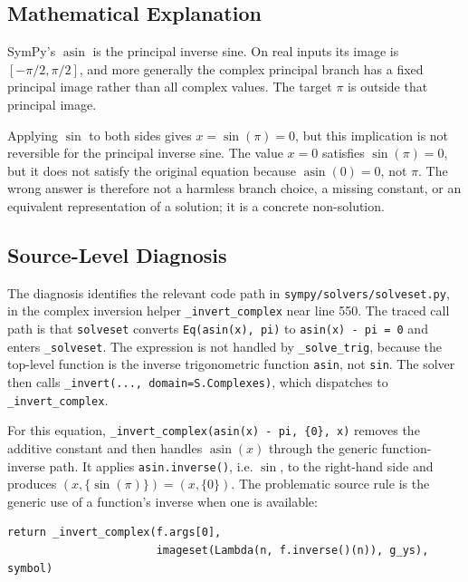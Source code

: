 \documentclass[11pt]{article}
\begin{document}
\subsection{Mathematical Explanation}

SymPy's \(\operatorname{asin}\) is the principal inverse sine.  On real inputs its image is
\([-\pi/2,\pi/2]\), and more generally the complex principal branch has a fixed
principal image rather than all complex values.  The target \(\pi\) is outside
that principal image.

Applying \(\sin\) to both sides gives \(x=\sin(\pi)=0\), but this implication
is not reversible for the principal inverse sine.  The value \(x=0\) satisfies
\(\sin(\pi)=0\), but it does not satisfy the original equation because
\(\operatorname{asin}(0)=0\), not \(\pi\).  The wrong answer is therefore not a harmless
branch choice, a missing constant, or an equivalent representation of a
solution; it is a concrete non-solution.

\subsection{Source-Level Diagnosis}

The diagnosis identifies the relevant code path in
\nolinkurl{sympy/solvers/solveset.py}, in the complex inversion helper
\texttt{\_invert\_complex} near line 550.  The traced call path is that
\texttt{solveset} converts \texttt{Eq(asin(x), pi)} to
\texttt{asin(x) - pi = 0} and enters \texttt{\_solveset}.  The expression is
not handled by \texttt{\_solve\_trig}, because the top-level function is the
inverse trigonometric function \texttt{asin}, not \texttt{sin}.  The solver then
calls \texttt{\_invert(..., domain=S.Complexes)}, which dispatches to
\texttt{\_invert\_complex}.

For this equation, \texttt{\_invert\_complex(asin(x) - pi, \{0\}, x)} removes
the additive constant and then handles \(\operatorname{asin}(x)\) through the generic
function-inverse path.  It applies \texttt{asin.inverse()}, i.e. \(\sin\), to
the right-hand side and produces \((x,\{\sin(\pi)\})=(x,\{0\})\).  The
problematic source rule is the generic use of a function's inverse when one is
available:

\begin{lstlisting}[style=bugpython]
return _invert_complex(f.args[0],
                       imageset(Lambda(n, f.inverse()(n)), g_ys), symbol)
\end{lstlisting}
\end{document}
